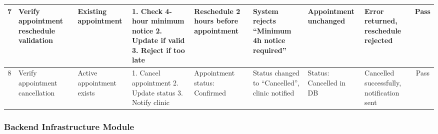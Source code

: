 \begin{table}[H]
{\begin{tabular}{|c|p{3cm}|p{2.5cm}|p{3.5cm}|p{3cm}|p{3cm}|p{2.5cm}|p{2.5cm}|c|}
7 & Verify appointment reschedule validation & Existing appointment & 1. Check 4-hour minimum notice 2. Update if valid 3. Reject if too late & Reschedule 2 hours before appointment & System rejects ``Minimum 4h notice required'' & Appointment unchanged & Error returned, reschedule rejected & Pass \\ \hline
8 & Verify appointment cancellation & Active appointment exists & 1. Cancel appointment 2. Update status 3. Notify clinic & Appointment status: Confirmed & Status changed to ``Cancelled'', clinic notified & Status: Cancelled in DB & Cancelled successfully, notification sent & Pass \\ \hline
\end{tabular}%
}
\label{tab:ut_vet}
\end{table}

\subsubsection{Backend Infrastructure Module}

